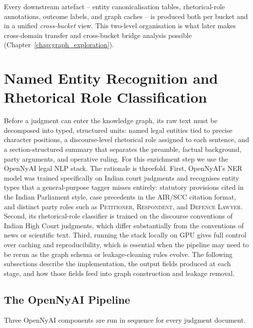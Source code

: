 Every downstream artefact -- entity canonicalisation tables,
rhetorical-role annotations, outcome labels, and graph caches -- is
produced both per bucket and in a unified \emph{cross-bucket} view.
This two-level organisation is what later makes cross-domain transfer
and cross-bucket bridge analysis possible
(Chapter~\ref{chap:graph_exploration}).

\section{Named Entity Recognition and Rhetorical Role Classification}
\label{sec:ner_rr}

Before a judgment can enter the knowledge graph, its raw text must be decomposed
into typed, structured units: named legal entities tied to precise character
positions, a discourse-level rhetorical role assigned to each sentence, and a
section-structured summary that separates the preamble, factual background, party
arguments, and operative ruling. For this enrichment step we use the OpenNyAI
legal NLP stack. The rationale is threefold. First, OpenNyAI's NER model was
trained specifically on Indian court judgments and recognises entity types that
a general-purpose tagger misses entirely: statutory provisions cited in the Indian
Parliament style, case precedents in the AIR/SCC citation format, and distinct
party roles such as \textsc{Petitioner}, \textsc{Respondent}, and
\textsc{Defence Lawyer}. Second, its rhetorical-role classifier is trained on the
discourse conventions of Indian High Court judgments, which differ substantially
from the conventions of news or scientific text. Third, running the stack locally
on GPU gives full control over caching and reproducibility, which is essential
when the pipeline may need to be rerun as the graph schema or leakage-cleaning
rules evolve. The following subsections describe the implementation, the output
fields produced at each stage, and how those fields feed into graph construction
and leakage removal.

\subsection{The OpenNyAI Pipeline}

Three OpenNyAI components are run in sequence for every judgment document.

